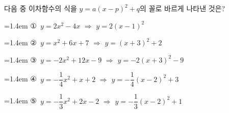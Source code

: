 \hspace*{2mm}\begin{minipage}[t]{\dimexpr\linewidth-2mm\relax}\vspace{0pt}
다음 중 이차함수의 식을 $y=a(x-p)^2+q$의 꼴로 바르게 나타낸 것은?
\par\medskip\par\noindent\hangindent=1.4em {\small ①}\ $y=2x^2-4x$ $\Rightarrow$ $y=2(x-1)^2$\par\noindent\hangindent=1.4em {\small ②}\ $y=x^2+6x+7$ $\Rightarrow$ $y=(x+3)^2+2$\par\noindent\hangindent=1.4em {\small ③}\ $y=-2x^2+12x-9$ $\Rightarrow$ $y=-2(x+3)^2-9$\par\noindent\hangindent=1.4em {\small ④}\ $y=-\dfrac{1}{4}x^2+x+2$ $\Rightarrow$ $y=-\dfrac{1}{4}(x-2)^2+3$\par\noindent\hangindent=1.4em {\small ⑤}\ $y=-\dfrac{1}{3}x^2+2x-2$ $\Rightarrow$ $y=-\dfrac{1}{3}(x-2)^2+1$\par\medskip\end{minipage}
